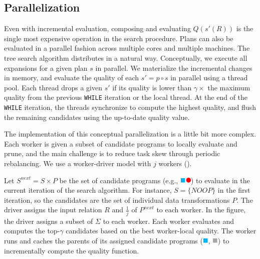 \subsection{Parallelization} 
Even with incremental evaluation, composing and evaluating $Q(s'(R))$ is the single most expensive operation in the search procedure.   
Plans can also be evaluated in a parallel fashion across multiple cores and multiple machines. 
The tree search algorithm distributes in a natural way.
Conceptually, we execute all expansions for a given plan $s$ in parallel.  We materialize the incremental changes in memory, and evaluate the quality of each $s' = p\circ s$ in parallel using a  thread pool.  Each thread drops a given $s'$ if its quality is lower than $\gamma\times$ the maximum quality from the previous \texttt{WHILE} iteration or the local thread.  At the end of the \texttt{WHILE} iteration, the threads synchronize to compute the highest quality, and flush the remaining candidates using the up-to-date quality value.

The implementation of this conceptual parallelization is a little bit more complex. 
Each worker is given a subset of candidate programs to locally evaluate and prune, and the main challenge is to reduce task skew through periodic rebalancing.  We use a worker-driver model with $j$ workers ().

Let $S^{next} = S\times P$ be the set of candidate programs (e.g., \includegraphics[height=8pt]{figures/program.pdf}) to evaluate in the current iteration of the search algorithm. For instance, $S=\{NOOP\}$ in the first iteration, so the candidates are the set of individual data transformations $P$.   The driver assigns the input relation $R$ and $\frac{1}{j}$ of $P^{next}$ to each worker.  In the figure, the driver assigns a subset of $\Sigma$ to each worker.  Each worker evaluates and computes the top-$\gamma$ candidates based on the best worker-local quality.   The worker runs and caches the parents of its assigned candidate programs (\includegraphics[height=8pt]{figures/sq-blue.pdf}, \includegraphics[height=8pt]{figures/sq-grey.pdf}) to incrementally compute the quality function.
  
